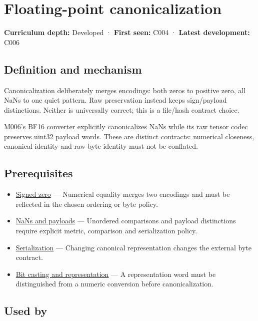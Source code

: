 \hypertarget{appendix-e90053a4b201}{}
\section{Floating-point canonicalization}\label{appendix-e90053a4b201-floating-point-canonicalization}

\textbf{Curriculum depth:} Developed · \textbf{First seen:} C004 · \textbf{Latest development:} C006

\subsection{Definition and mechanism}\label{appendix-e90053a4b201-definition-and-mechanism}

Canonicalization deliberately merges encodings: both zeros to positive zero, all NaNs to one quiet pattern. Raw preservation instead keeps sign/payload distinctions. Neither is universally correct; this is a file/hash contract choice.

M006's BF16 converter explicitly canonicalizes NaNs while its raw tensor codec preserves uint32 payload words. These are distinct contracts: numerical closeness, canonical identity and raw byte identity must not be conflated.

\subsection{Prerequisites}\label{appendix-e90053a4b201-prerequisites}

\begin{itemize}
\tightlist
\item
  \hyperref[appendix-3a048f032c1f]{Signed zero} --- Numerical equality merges two encodings and must be reflected in the chosen ordering or byte policy.
\item
  \hyperref[appendix-d6607cc4c235]{NaNs and payloads} --- Unordered comparisons and payload distinctions require explicit metric, comparison and serialization policy.
\item
  \hyperref[appendix-91d09ebed979]{Serialization} --- Changing canonical representation changes the external byte contract.
\item
  \hyperref[appendix-34ee45f161c1]{Bit casting and representation} --- A representation word must be distinguished from a numeric conversion before canonicalization.
\end{itemize}

\subsection{Used by}\label{appendix-e90053a4b201-used-by}

